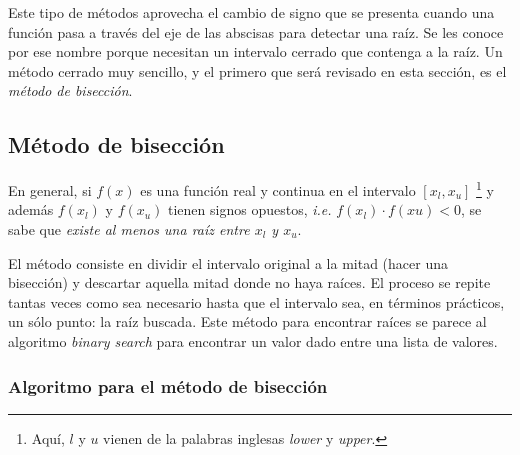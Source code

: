 Este tipo de métodos aprovecha el cambio de signo que se presenta cuando una
función pasa a través del eje de las abscisas para detectar una raíz. Se les
conoce por ese nombre porque necesitan un intervalo cerrado que contenga a la
raíz. Un método cerrado muy sencillo, y el primero que será revisado en esta
sección, es el \emph{método de bisección}.

\subsection{Método de bisección}

En general, si $f(x)$ es una función real y continua en el intervalo $[x_l,
x_u]$ \footnote{Aquí, $l$ y $u$ vienen de la palabras inglesas \textit{lower} y
\textit{upper}.} y además $f(x_l)$ y $f(x_u)$ tienen signos opuestos,
\textit{i.e.} $f(x_l) \cdot f(xu) < 0$, se sabe que \emph{existe al menos una
raíz entre $x_l$ y $x_u$}.

El método consiste en dividir el intervalo original a la mitad (hacer una
bisección) y descartar aquella mitad donde no haya raíces. El proceso se repite
tantas veces como sea necesario hasta que el intervalo sea, en términos
prácticos, un sólo punto: la raíz buscada. Este método para encontrar raíces se
parece al algoritmo \textit{binary search} para encontrar un valor dado entre
una lista de valores.

\subsubsection{Algoritmo para el método de bisección}


